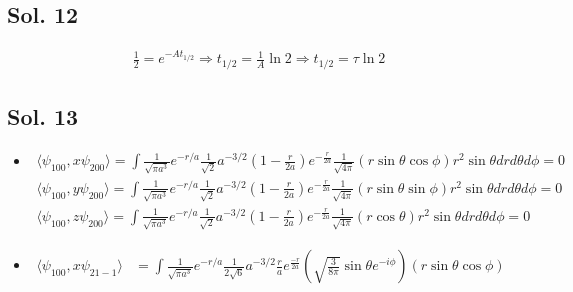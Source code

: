 \subsection*{Sol. 12}
\begin{align*}
    \frac{1}{2}=e^{-At_{1/2}}\Rightarrow t_{1/2} = \frac{1}{A}\ln 2\Rightarrow t_{1/2} = \tau\ln 2
\end{align*}

\subsection*{Sol. 13}
\begin{itemize}
    \item
          \begin{align*}
              \langle
              \psi_{100}, x
              \psi_{200}
              \rangle  =
              \int
              \frac{1}{\sqrt{\pi a^3}}e^{-r/a}
              \frac{1}{\sqrt{2}}a^{-3/2}\left(1 - \frac{r}{2a}\right)e^{-\frac{r}{2a}}\frac{1}{\sqrt{4\pi}}(r\sin\theta\cos\phi)
              r^2\sin\theta drd\theta d\phi = 0
          \end{align*}
          \begin{align*}
              \langle
              \psi_{100}, y
              \psi_{200}
              \rangle  =
              \int
              \frac{1}{\sqrt{\pi a^3}}e^{-r/a}
              \frac{1}{\sqrt{2}}a^{-3/2}\left(1 - \frac{r}{2a}\right)e^{-\frac{r}{2a}}\frac{1}{\sqrt{4\pi}}(r\sin\theta\sin\phi)
              r^2\sin\theta drd\theta d\phi = 0
          \end{align*}
          \begin{align*}
              \langle
              \psi_{100}, z
              \psi_{200}
              \rangle  =
              \int
              \frac{1}{\sqrt{\pi a^3}}e^{-r/a}
              \frac{1}{\sqrt{2}}a^{-3/2}\left(1 - \frac{r}{2a}\right)e^{-\frac{r}{2a}}\frac{1}{\sqrt{4\pi}}(r\cos\theta)
              r^2\sin\theta drd\theta d\phi = 0
          \end{align*}
    \item
          \begin{align*}
              \langle
              \psi_{100}, x
              \psi_{21-1}
              \rangle & =
              \int
              \frac{1}{\sqrt{\pi a^3}}e^{-r/a}
              \frac{1}{2\sqrt{6}}a^{-3/2}\frac{r}{a}
              e^{\frac{-r}{2a}}
              \left(
              \sqrt{\frac{3}{8\pi}}\sin\theta e^{-i\phi}
              \right)(r\sin\theta\cos\phi)

\end{align*}
\end{itemize}
